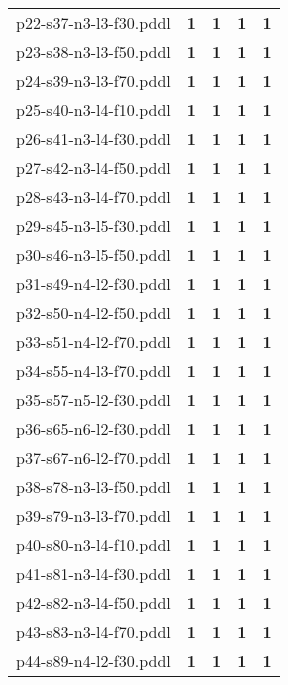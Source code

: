 \documentclass{article}
\begin{document}
\begin{tabular}{@{}lrrrr@{}}
p22-s37-n3-l3-f30.pddl & \textbf{1} & \textbf{1} & \textbf{1} & \textbf{1} \\
p23-s38-n3-l3-f50.pddl & \textbf{1} & \textbf{1} & \textbf{1} & \textbf{1} \\
p24-s39-n3-l3-f70.pddl & \textbf{1} & \textbf{1} & \textbf{1} & \textbf{1} \\
p25-s40-n3-l4-f10.pddl & \textbf{1} & \textbf{1} & \textbf{1} & \textbf{1} \\
p26-s41-n3-l4-f30.pddl & \textbf{1} & \textbf{1} & \textbf{1} & \textbf{1} \\
p27-s42-n3-l4-f50.pddl & \textbf{1} & \textbf{1} & \textbf{1} & \textbf{1} \\
p28-s43-n3-l4-f70.pddl & \textbf{1} & \textbf{1} & \textbf{1} & \textbf{1} \\
p29-s45-n3-l5-f30.pddl & \textbf{1} & \textbf{1} & \textbf{1} & \textbf{1} \\
p30-s46-n3-l5-f50.pddl & \textbf{1} & \textbf{1} & \textbf{1} & \textbf{1} \\
p31-s49-n4-l2-f30.pddl & \textbf{1} & \textbf{1} & \textbf{1} & \textbf{1} \\
p32-s50-n4-l2-f50.pddl & \textbf{1} & \textbf{1} & \textbf{1} & \textbf{1} \\
p33-s51-n4-l2-f70.pddl & \textbf{1} & \textbf{1} & \textbf{1} & \textbf{1} \\
p34-s55-n4-l3-f70.pddl & \textbf{1} & \textbf{1} & \textbf{1} & \textbf{1} \\
p35-s57-n5-l2-f30.pddl & \textbf{1} & \textbf{1} & \textbf{1} & \textbf{1} \\
p36-s65-n6-l2-f30.pddl & \textbf{1} & \textbf{1} & \textbf{1} & \textbf{1} \\
p37-s67-n6-l2-f70.pddl & \textbf{1} & \textbf{1} & \textbf{1} & \textbf{1} \\
p38-s78-n3-l3-f50.pddl & \textbf{1} & \textbf{1} & \textbf{1} & \textbf{1} \\
p39-s79-n3-l3-f70.pddl & \textbf{1} & \textbf{1} & \textbf{1} & \textbf{1} \\
p40-s80-n3-l4-f10.pddl & \textbf{1} & \textbf{1} & \textbf{1} & \textbf{1} \\
p41-s81-n3-l4-f30.pddl & \textbf{1} & \textbf{1} & \textbf{1} & \textbf{1} \\
p42-s82-n3-l4-f50.pddl & \textbf{1} & \textbf{1} & \textbf{1} & \textbf{1} \\
p43-s83-n3-l4-f70.pddl & \textbf{1} & \textbf{1} & \textbf{1} & \textbf{1} \\
p44-s89-n4-l2-f30.pddl & \textbf{1} & \textbf{1} & \textbf{1} & \textbf{1} \\

\end{tabular}
\end{document}
